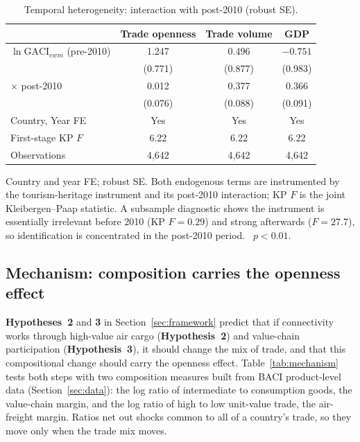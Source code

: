 \begin{table}[H]
\centering
\caption{Temporal heterogeneity: interaction with post-2010 (robust SE).}
\label{tab:temporal}
\begin{threeparttable}
\small
\begin{tabular}{lccc}
\toprule
 & Trade openness & Trade volume & GDP \\
\midrule
$\ln\mathrm{GACI}_{cwm}$ (pre-2010) & 1.247   & 0.496   & $-0.751$ \\
                        & (0.771) & (0.877) & (0.983) \\
$\times$ post-2010      & 0.012   & 0.377\sym{***} & 0.366\sym{***} \\
                        & (0.076) & (0.088) & (0.091) \\
\midrule
Country, Year FE        & Yes & Yes & Yes \\
First-stage KP $F$      & 6.22 & 6.22 & 6.22 \\
Observations            & 4{,}642 & 4{,}642 & 4{,}642 \\
\bottomrule
\end{tabular}
\begin{tablenotes}\small
\item Country and year FE; robust SE. Both endogenous terms are instrumented
by the tourism-heritage instrument and its post-2010 interaction; KP $F$ is
the joint Kleibergen--Paap statistic. A subsample diagnostic shows the
instrument is essentially irrelevant before 2010 (KP $F=0.29$) and strong
afterwards ($F=27.7$), so identification is concentrated in the post-2010
period.
\sym{***}~$p<0.01$.
\end{tablenotes}
\end{threeparttable}
\end{table}

\subsection{Mechanism: composition carries the openness effect}
\label{sec:mechanism}
\label{sec:mediation}
\textbf{Hypotheses~2} and \textbf{3} in Section~\ref{sec:framework} predict that if
connectivity works through high-value air cargo (\textbf{Hypothesis~2}) and
value-chain participation (\textbf{Hypothesis~3}), it should change the mix of trade,
and that this compositional change should carry the openness effect.
Table~\ref{tab:mechanism} tests both steps with two composition measures
built from BACI product-level data (Section~\ref{sec:data}): the log
ratio of intermediate to consumption goods, the value-chain margin, and
the log ratio of high to low unit-value trade, the air-freight margin.
Ratios net out shocks common to all of a country's trade, so they move
only when the trade mix moves.

